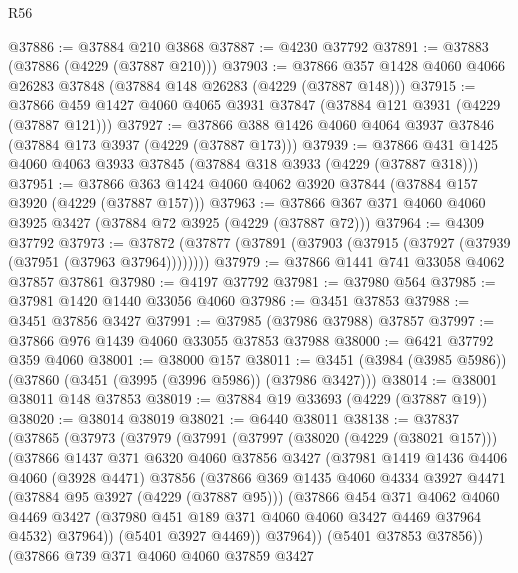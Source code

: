 \begin{lexlean}{R56}
\begin{coremodule}
@37886 := @37884 @210 @3868
@37887 := @4230 @37792
@37891 := @37883 (@37886 (@4229 (@37887 @210)))
@37903 := @37866 @357 @1428 @4060 @4066 @26283 @37848 (@37884 @148 @26283 (@4229 (@37887 @148)))
@37915 := @37866 @459 @1427 @4060 @4065 @3931 @37847 (@37884 @121 @3931 (@4229 (@37887 @121)))
@37927 := @37866 @388 @1426 @4060 @4064 @3937 @37846 (@37884 @173 @3937 (@4229 (@37887 @173)))
@37939 := @37866 @431 @1425 @4060 @4063 @3933 @37845 (@37884 @318 @3933 (@4229 (@37887 @318)))
@37951 := @37866 @363 @1424 @4060 @4062 @3920 @37844 (@37884 @157 @3920 (@4229 (@37887 @157)))
@37963 := @37866 @367 @371 @4060 @4060 @3925 @3427 (@37884 @72 @3925 (@4229 (@37887 @72)))
@37964 := @4309 @37792
@37973 := @37872 (@37877 (@37891 (@37903 (@37915 (@37927 (@37939 (@37951 (@37963 @37964))))))))
@37979 := @37866 @1441 @741 @33058 @4062 @37857 @37861
@37980 := @4197 @37792
@37981 := @37980 @564
@37985 := @37981 @1420 @1440 @33056 @4060
@37986 := @3451 @37853
@37988 := @3451 @37856 @3427
@37991 := @37985 (@37986 @37988) @37857
@37997 := @37866 @976 @1439 @4060 @33055 @37853 @37988
@38000 := @6421 @37792 @359 @4060
@38001 := @38000 @157
@38011 := @3451 (@3984 (@3985 @5986)) (@37860 (@3451 (@3995 (@3996 @5986)) (@37986 @3427)))
@38014 := @38001 @38011 @148 @37853
@38019 := @37884 @19 @33693 (@4229 (@37887 @19))
@38020 := @38014 @38019
@38021 := @6440 @38011
@38138 := @37837
    (@37865
      (@37973
        (@37979
          (@37991
            (@37997
              (@38020 (@4229 (@38021 @157)))
              (@37866
                @1437
                @371
                @6320
                @4060
                @37856
                @3427
                (@37981
                  @1419
                  @1436
                  @4406
                  @4060
                  (@3928 @4471)
                  @37856
                  (@37866
                    @369
                    @1435
                    @4060
                    @4334
                    @3927
                    @4471
                    (@37884 @95 @3927 (@4229 (@37887 @95)))
                    (@37866
                      @454
                      @371
                      @4062
                      @4060
                      @4469
                      @3427
                      (@37980 @451 @189 @371 @4060 @4060 @3427 @4469 @37964 @4532)
                      @37964))
                  (@5401 @3927 @4469))
                @37964))
            (@5401 @37853 @37856))
          (@37866
            @739
            @371
            @4060
            @4060
            @37859
            @3427

\end{coremodule}
\end{lexlean}

